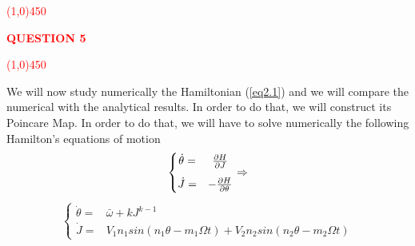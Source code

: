%
\textcolor{red}{
\line(1,0){450}\\
\begin{center}
	\textbf{QUESTION 5}
\end{center}
\line(1,0){450}\\
}
%
%
%
%


We will now study numerically the Hamiltonian (\ref{eq2.1}) and we will compare the numerical with the analytical results. In order to do that, we will construct its Poincare Map. In order to do that, we will have to solve numerically the following Hamilton's equations of motion
	\begin{align*}
	\left\{
		\begin{matrix}
			\dot{\theta} =& \pdv{H}{J     }  \vspace{0.3cm}\\
			\dot{J     } =& -\pdv{H}{\theta}
		\end{matrix}  \right. \Rightarrow \\
	\end{align*}\vspace{-1.2cm}
	\begin{align*}
		\left\{
		\begin{matrix}
			\dot{\theta} =& \bar{\omega} + kJ^{k-1} \\
			\dot{J     } =& V_1n_1sin(n_1\theta-m_1\Omega t) + V_2n_2sin(n_2\theta-m_2\Omega t)
		\end{matrix}  \right.
	\end{align*}